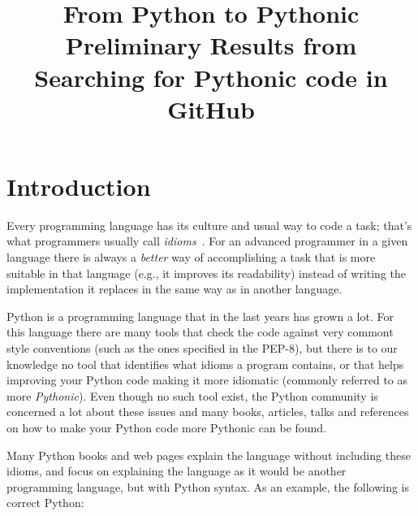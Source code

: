 \documentclass[conference]{IEEEtran}
\begin{document}
\title{From Python to Pythonic\\ Preliminary Results from Searching for Pythonic code in GitHub}


\author{
\and
{}
}


\maketitle
\IEEEpeerreviewmaketitle

\section{Introduction}

Every programming language has its culture and usual way to code a task; that's what programmers usually call \emph{idioms}~\cite{coplien1997advanced}. For an advanced programmer in a given language there is always a \emph{better} way of accomplishing a task that is more suitable in that language (e.g., it improves its readability) instead of writing the implementation it replaces in the same way as in another language.

Python is a programming language that in the last years has grown a lot. For this language there are many tools that check the code against very commont style conventions (such as the ones specified in the PEP-8), but there is to our knowledge no tool that identifies what idioms a program contains, or that helps improving your Python code making it more idiomatic (commonly referred to as more \emph{Pythonic}). Even though no such tool exist, the Python community is concerned a lot about these issues and many books, articles, talks and references on how to make your Python code more Pythonic can be found.

Many Python books and web pages explain the language without including these idioms, and focus on explaining the language as it would be another programming language, but with Python syntax. As an example, the following is correct Python:
\end{document}
